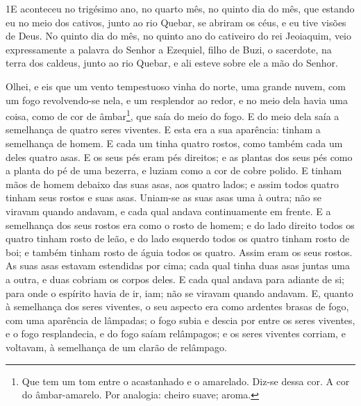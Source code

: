 
\lettrine{1} E aconteceu no trigésimo ano, no quarto mês, no
quinto dia do mês, que estando eu no meio dos cativos, junto ao rio
Quebar, se abriram os céus, e eu tive visões de Deus. No quinto
dia do mês, no quinto ano do cativeiro do rei Jeoiaquim, veio
expressamente a palavra do Senhor a Ezequiel, filho de Buzi, o
sacerdote, na terra dos caldeus, junto ao rio Quebar, e ali esteve
sobre ele a mão do Senhor.

Olhei, e eis que um vento tempestuoso vinha do norte, uma grande
nuvem, com um fogo revolvendo-se nela, e um resplendor ao redor, e
no meio dela havia uma coisa, como de cor de âmbar\footnote{Que tem
um tom entre o acastanhado e o amarelado. Diz-se dessa cor. A cor do
âmbar-amarelo. Por analogia: cheiro suave; aroma.}, que saía do meio
do fogo. E do meio dela saía a semelhança de quatro seres
viventes. E esta era a sua aparência: tinham a semelhança de homem.
E cada um tinha quatro rostos, como também cada um deles quatro
asas. E os seus pés eram pés direitos; e as plantas dos seus pés
como a planta do pé de uma bezerra, e luziam como a cor de cobre
polido. E tinham mãos de homem debaixo das suas asas, aos quatro
lados; e assim todos quatro tinham seus rostos e suas asas.
Uniam-se as suas asas uma à outra; não se viravam quando
andavam, e cada qual andava continuamente em frente. E a
semelhança dos seus rostos era como o rosto de homem; e do lado
direito todos os quatro tinham rosto de leão, e do lado esquerdo
todos os quatro tinham rosto de boi; e também tinham rosto de águia
todos os quatro. Assim eram os seus rostos. As suas asas
estavam estendidas por cima; cada qual tinha duas asas juntas uma a
outra, e duas cobriam os corpos deles. E cada qual andava
para adiante de si; para onde o espírito havia de ir, iam; não se
viravam quando andavam. E, quanto à semelhança dos seres
viventes, o seu aspecto era como ardentes brasas de fogo, com uma
aparência de lâmpadas; o fogo subia e descia por entre os seres
viventes, e o fogo resplandecia, e do fogo saíam relâmpagos;
e os seres viventes corriam, e voltavam, à semelhança de um
clarão de relâmpago.

